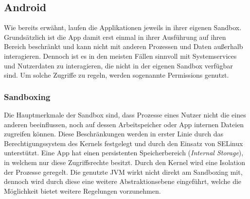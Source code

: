 \subsection{Android}
 \label{sec:SandBoxingNPermissions}
	Wie bereits erwähnt, laufen die Applikationen jeweils in ihrer eigenen Sandbox. Grundsätzlich ist die App damit erst einmal in ihrer Ausführung auf ihren Bereich beschränkt und kann nicht mit anderen Prozessen und Daten außerhalb interagieren. Dennoch ist es in den meisten Fällen sinnvoll mit Systemservices und Nutzerdaten zu interagieren, die nicht in der eigenen Sandbox verfügbar sind. Um solche Zugriffe zu regeln, werden sogenannte Permissions genutzt.
	
	\subsubsection{Sandboxing}
	Die Hauptmerkmale der Sandbox sind, dass Prozesse eines Nutzer nicht die eines anderen beeinflussen, noch auf dessen Arbeitspeicher oder App internen Dateien zugreifen können. Diese Beschränkungen werden in erster Linie durch das Berechtigungssystem des Kernels festgelegt und durch den Einsatz von SELinux unterstützt. Eine App hat einen persistenten Speicherbereich (\textit{Internal Storage}), in welchem nur diese Zugriffsrechte besitzt. Durch den Kernel wird eine Isolation der Prozesse geregelt. Die genutzte JVM wirkt nicht direkt am Sandboxing mit, dennoch wird durch diese eine weitere Abstraktionsebene eingeführt, welche die Möglichkeit bietet weitere Regelungen vorzunehmen. %
	
